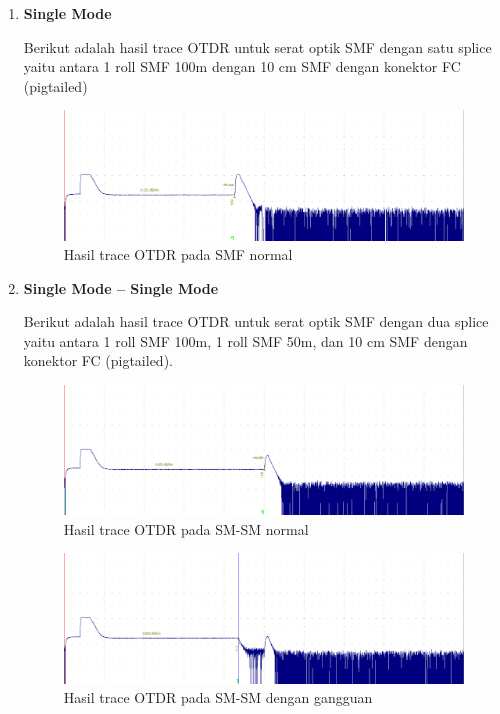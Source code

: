 \documentclass[12pt]{article}
\begin{document}
	\begin{enumerate}
		\item \textbf{Single Mode}

		Berikut adalah hasil trace OTDR untuk serat optik SMF dengan satu splice yaitu antara 1 roll SMF 100m dengan 10 cm SMF dengan konektor FC (pigtailed)
		
		\begin{figure}[h!]
			\centering
			\captionsetup{justification=centering}
			\includegraphics[width=0.5\linewidth]{images/Bab_4/Bab_4_3a1}
			\caption[Trace SMF]{\small{Hasil trace OTDR pada SMF normal}}
		\end{figure}
		
		\item \textbf{Single Mode – Single Mode}
		
		Berikut adalah hasil trace OTDR untuk serat optik SMF dengan dua splice yaitu antara 1 roll SMF 100m, 1 roll SMF 50m, dan 10 cm SMF dengan konektor FC (pigtailed).
		
		\begin{figure}[h!]
			\centering
			\captionsetup{justification=centering}
			\includegraphics[width=0.5\linewidth]{images/Bab_4/Bab_4_3b1}
			\caption[Trace SMF-SMF]{\small{Hasil trace OTDR pada SM-SM normal}}
		\end{figure}
		
		\begin{figure}[h!]
			\centering
			\captionsetup{justification=centering}
			\includegraphics[width=0.5\linewidth]{images/Bab_4/Bab_4_3b2}
			\caption[Trace SMF-SMF]{\small{Hasil trace OTDR pada SM-SM dengan gangguan}}
		\end{figure}
		
\newpage	
		

\end{enumerate}
\end{document}
